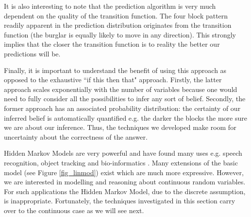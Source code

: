 It is also interesting to note that the prediction algorithm is very much dependent on the quality of the transition function. The four block pattern readily apparent in the prediction distribution originates from the transition function (the burglar is equally likely to move in any direction). This strongly implies that the closer the transition function is to reality the better our predictions will be.

Finally, it is important to understand the benefit of using this approach as opposed to the exhaustive ``if this then that" approach. Firstly, the latter approach scales exponentially with the number of variables because one would need to fully consider all the possibilities to infer any sort of belief. Secondly, the former approach has an associated probability distribution: the certainty of our inferred belief is automatically quantified e.g. the darker the blocks the more sure we are about our inference. Thus, the techniques we developed make room for uncertainty about the correctness of the answer.

Hidden Markov Models are very powerful and have found many uses e.g. speech recognition, object tracking and bio-informatics \cite{barber}. Many extensions of the basic model (see Figure \ref{fig_linmod}) exist which are much more expressive. However, we are interested in modelling and reasoning about continuous random variables. For such applications the Hidden Markov Model, due to the discrete assumption, is inappropriate. Fortunately, the techniques investigated in this section carry over to the continuous case as we will see next.  
